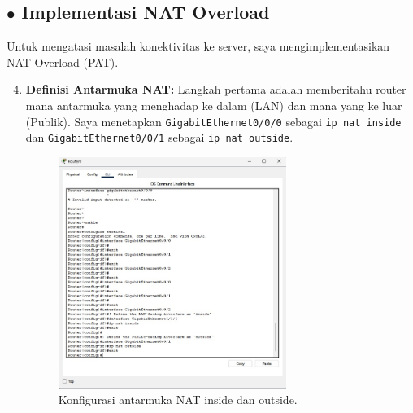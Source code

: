 \subsection*{$\bullet$ Implementasi NAT Overload}
Untuk mengatasi masalah konektivitas ke server, saya mengimplementasikan NAT Overload (PAT).
\begin{enumerate}
    \setcounter{enumi}{3}
    \item \textbf{Definisi Antarmuka NAT:} Langkah pertama adalah memberitahu router mana antarmuka yang menghadap ke dalam (LAN) dan mana yang ke luar (Publik). Saya menetapkan \texttt{GigabitEthernet0/0/0} sebagai \texttt{ip nat inside} dan \texttt{GigabitEthernet0/0/1} sebagai \texttt{ip nat outside}.
    \begin{figure}[H]
        \centering
        \includegraphics[width=0.7\textwidth]{img4/NATInterface.jpeg}
        \caption{Konfigurasi antarmuka NAT inside dan outside.}
    \end{figure}
    

\end{enumerate}
